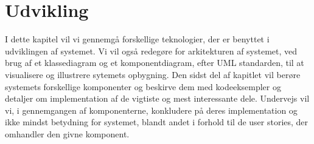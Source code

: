 \chapter{Udvikling}
I dette kapitel vil vi gennemgå forskellige teknologier, der er benyttet i udviklingen af systemet.
Vi vil også redegøre for arkitekturen af systemet, ved brug af et klassediagram og et komponentdiagram, efter UML standarden, til at visualisere og illustrere sytemets opbygning.
Den sidst del af kapitlet vil berøre systemets forskellige komponenter og beskirve dem med kodeeksempler og detaljer om implementation af de vigtiste og mest interessante dele. 
Undervejs vil vi, i gennemgangen af komponenterne, konkludere på deres implementation og ikke mindst betydning for systemet, blandt andet i forhold til de user stories, der omhandler den givne komponent.








